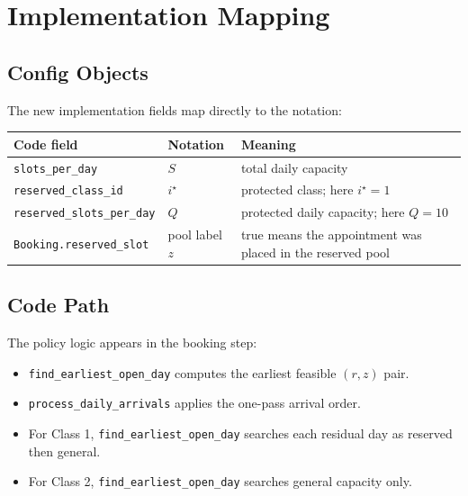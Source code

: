\documentclass[11pt]{article}
\begin{document}
\section{Implementation Mapping}

\subsection{Config Objects}

The new implementation fields map directly to the notation:
\begin{center}
\small
\begin{tabular}{L{0.30\textwidth} L{0.22\textwidth} L{0.36\textwidth}}
\toprule
\textbf{Code field} & \textbf{Notation} & \textbf{Meaning} \\
\midrule
\texttt{slots\_per\_day} & \(S\) & total daily capacity \\
\addlinespace
\texttt{reserved\_class\_id} & \(i^\star\) & protected class; here \(i^\star=1\) \\
\addlinespace
\texttt{reserved\_slots\_per\_day} & \(Q\) & protected daily capacity; here \(Q=10\) \\
\addlinespace
\texttt{Booking.reserved\_slot} & pool label \(z\) & true means the appointment was placed in the reserved pool \\
\bottomrule
\end{tabular}
\normalsize
\end{center}

\subsection{Code Path}

The policy logic appears in the booking step:
\begin{itemize}[nosep]
    \item \texttt{find\_earliest\_open\_day} computes the earliest feasible \((r,z)\) pair.
    \item \texttt{process\_daily\_arrivals} applies the one-pass arrival order.
    \item For Class 1, \texttt{find\_earliest\_open\_day} searches each residual day as reserved then general.
    \item For Class 2, \texttt{find\_earliest\_open\_day} searches general capacity only.
\end{itemize}
\end{document}
